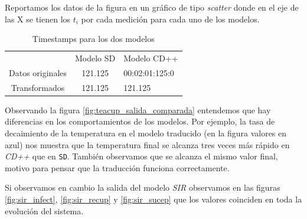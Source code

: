 Reportamos los datos de la figura en un gráfico de tipo \textit{scatter} donde en el eje de las X se tienen los $t_i$ por cada medición para cada uno de los modelos.

\begin{table}[H]
    \centering
    \label{tab:times}
    \begin{tabular}{c | c  l}
        & Modelo SD & Modelo CD++ \\
       Datos originales & 121.125 & 00:02:01:125:0 \\ 
        Transformados & 121.125 & 121.125
    \end{tabular}
    \caption{Timestamps para los dos modelos} 
\end{table}


Observando la figura \ref{fig:teacup_salida_comparada} entendemos que hay diferencias en los comportamientos de los modelos. Por ejemplo, la tasa de decaimiento de la temperatura en el modelo traducido (en la figura valores en azul) nos muestra que la temperatura final se alcanza tres veces más rápido en \textit{CD++} que en \texttt{SD}.
También observamos que se alcanza el mismo valor final, motivo para pensar que la traducción funciona correctamente.

\begin{figure}[H]
    \centering     %
\end{figure}

Si observamos en cambio la salida del modelo \textit{SIR} observamos en las figuras \ref{fig:sir_infect}, \ref{fig:sir_recup} y \ref{fig:sir_sucep} que los valores coinciden en toda la evolución del sistema.

